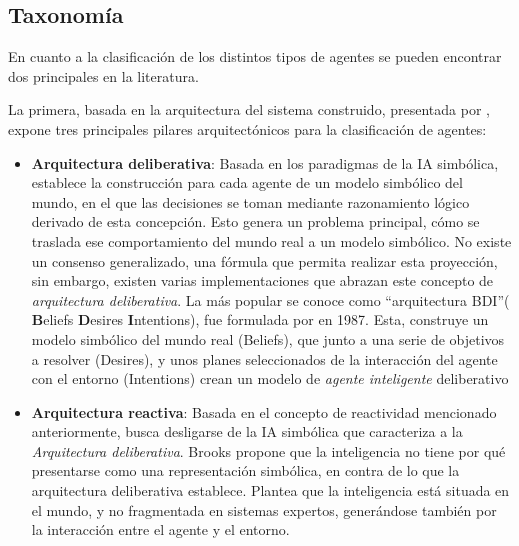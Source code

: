 \subsection{Taxonomía}
En cuanto a la clasificación de los distintos tipos de agentes se pueden encontrar dos principales en la literatura.

La primera, basada en la arquitectura del sistema construido, presentada por \textcite{Wooldridge1995}, expone tres principales pilares arquitectónicos para la clasificación de agentes:

\begin{itemize}

\item \textbf{Arquitectura deliberativa}:
Basada en los paradigmas de la IA simbólica, establece la construcción para cada agente de un modelo simbólico del mundo, en el que las decisiones se toman mediante razonamiento lógico derivado de esta concepción\cite{Wooldridge1995}. Esto genera un problema principal, cómo se traslada ese comportamiento del mundo real a un modelo simbólico. No existe un consenso generalizado, una fórmula que permita realizar esta proyección, sin embargo, existen varias implementaciones que abrazan este concepto de \textit{arquitectura deliberativa}. La más popular se conoce como \enquote{arquitectura BDI}( \textbf{B}eliefs \textbf{D}esires \textbf{I}ntentions), fue formulada por \textcite{bratman1987intention} en 1987. Esta, construye un modelo simbólico del mundo real (Beliefs), que junto a una serie de objetivos a resolver (Desires), y unos planes seleccionados de la interacción del agente con el entorno (Intentions) crean un modelo de \textit{agente inteligente} deliberativo

\item \textbf{Arquitectura reactiva}:
Basada en el concepto de reactividad mencionado anteriormente, busca desligarse de la IA simbólica que caracteriza a la \textit{Arquitectura deliberativa}. Brooks\cite{brooks1990elephants,brooks1991intelligence,brooks1991representation} propone que la inteligencia no tiene por qué presentarse como una representación simbólica, en contra de lo que la arquitectura deliberativa establece. Plantea que la inteligencia está situada en el mundo, y no fragmentada en sistemas expertos, generándose también por la interacción entre el agente y el entorno.


\end{itemize}
